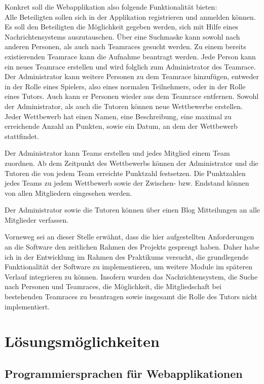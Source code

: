\documentclass[12pt]{report}
\begin{document}
Konkret soll die Webapplikation also folgende Funktionalität bieten:\\
Alle Beteiligten sollen sich in der Applikation registrieren und anmelden können. Es soll den Beteiligten die Möglichkeit gegeben werden, sich mit Hilfe eines Nachrichtensystems auszutauschen. Über eine Suchmaske kann sowohl nach anderen Personen, als auch nach Teamraces gesucht werden. Zu einem bereits existierenden Teamrace kann die Aufnahme beantragt werden. Jede Person kann ein neues Teamrace erstellen und wird folglich zum Administrator des Teamrace. Der Administrator kann weitere Personen zu dem Teamrace hinzufügen, entweder in der Rolle eines Spielers, also eines normalen Teilnehmers, oder in der Rolle eines Tutors. Auch kann er Personen wieder aus dem Teamrace entfernen. Sowohl der Administrator, als auch die Tutoren können neue Wettbewerbe erstellen. Jeder Wettbewerb hat einen Namen, eine Beschreibung, eine maximal zu erreichende Anzahl an Punkten, sowie ein Datum, an dem der Wettbewerb stattfindet. 

Der Administrator kann Teams erstellen und jedes Mitglied einem Team zuordnen. Ab dem Zeitpunkt des Wettbewerbs können der Administrator und die Tutoren die von jedem Team erreichte Punktzahl festsetzen. Die Punktzahlen jedes Teams zu jedem Wettbewerb sowie der Zwischen- bzw. Endstand können von allen Mitgliedern eingesehen werden.

Der Administrator sowie die Tutoren können über einen Blog Mitteilungen an alle Mitglieder verfassen.

Vorneweg sei an dieser Stelle erwähnt, dass die hier aufgestellten Anforderungen an die Software den zeitlichen Rahmen des Projekts gesprengt haben. Daher habe ich in der Entwicklung im Rahmen des Praktikums versucht, die grundlegende Funktionalität der Software zu implementieren, um weitere Module im späteren Verlauf integrieren zu können. Insofern wurden das Nachrichtensystem, die Suche nach Personen und Teamraces, die Möglichkeit, die Mitgliedschaft bei bestehenden Teamraces zu beantragen sowie insgesamt die Rolle des Tutors nicht implementiert.



\chapter{Lösungsmöglichkeiten}

\section{Programmiersprachen für Webapplikationen}
\label{sec:Programmiersprachen}
\end{document}
